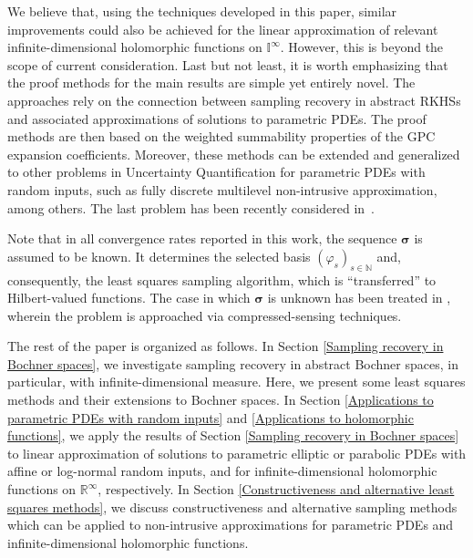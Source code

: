 \documentclass[11pt]{article}
\numberwithin{equation}{section}
\theoremstyle{definition}
\theoremstyle{remark}
\newcommand{\bsigma}{{\boldsymbol{\sigma}}}
\def\NN{{\mathbb N}}
\def\NN{{\mathbb N}}
\def\IIi{{\mathbb I}^\infty}
\def\RRi{{\mathbb R}^\infty}
\def\NN{{\mathbb N}}
\begin{document}
We believe that, using the techniques developed in this paper, similar improvements could also be achieved for the linear approximation of relevant infinite-dimensional holomorphic functions on $\IIi$.
However, this is beyond the scope of current consideration.
Last but not least, it is worth emphasizing that the proof methods for the main results are simple yet entirely novel.
The approaches rely on the connection between sampling recovery in abstract RKHSs and {associated approximations} of solutions to parametric PDEs.
The proof methods { are then based} on the weighted summability properties of the GPC expansion coefficients.
Moreover, these methods {can be extended and generalized} to other problems in Uncertainty Quantification for parametric PDEs with random inputs, such as fully discrete multilevel non-intrusive approximation, among others.
{The last problem has been recently considered in~\cite{DD2025}.}



Note that in all convergence rates reported in this work, the  sequence 
$\bsigma$
is assumed to be known.
It determines the selected basis $(\varphi_s)_{s \in \NN}$ and, consequently, the least squares sampling algorithm, which is ``transferred'' to Hilbert-valued functions.
The case in which 
$\bsigma$
is unknown has been treated in \cite{ADM2024}, wherein the problem is approached via compressed-sensing techniques.

The rest of the paper is organized as follows. In Section \ref{Sampling recovery in Bochner spaces}, we investigate sampling recovery in abstract Bochner spaces, in particular, with infinite-dimensional measure. Here, we present some least squares methods and their extensions to Bochner spaces. In Section 
\ref{Applications to parametric PDEs with random inputs} and 
\ref{Applications to holomorphic functions}, we apply the results of Section 
\ref{Sampling recovery in Bochner spaces} to linear  approximation of solutions to parametric elliptic or parabolic PDEs with affine 
or log-normal {random inputs, and for} infinite-dimensional holomorphic functions on $\RRi$, respectively.
In Section \ref{Constructiveness and alternative least squares methods}, we discuss constructiveness and alternative sampling methods which can be applied to {non-intrusive} approximations for parametric PDEs and infinite-dimensional holomorphic functions.
\end{document}
